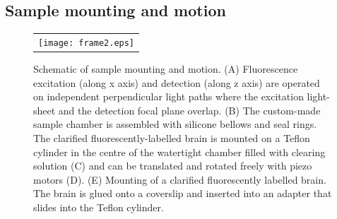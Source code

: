 \documentclass[12pt]{spieman}  %
\begin{document}
\subsection{Sample mounting and motion}
\label{sec:mounting}
%
		
\begin{figure}
   \begin{center}
   \begin{tabular}{c}
   \texttt{[image: frame2.eps]}
   \end{tabular}
   \end{center}
   \caption{\label{fig:frame2} Schematic of sample mounting and motion. (A) Fluorescence excitation (along x axis) and detection (along z axis) are operated on independent perpendicular light paths where the excitation light-sheet and the detection focal plane overlap. (B) The custom-made sample chamber is assembled with silicone bellows and seal rings. The clarified fluorescently-labelled brain is mounted on a Teflon cylinder in the centre of the watertight chamber filled with clearing solution (C) and can be translated and rotated freely with piezo motors (D). (E) Mounting of a clarified fluorescently labelled brain. The brain is glued onto a coverslip and inserted into an adapter that slides into the Teflon cylinder.} 
   \end{figure}		
\end{document}
